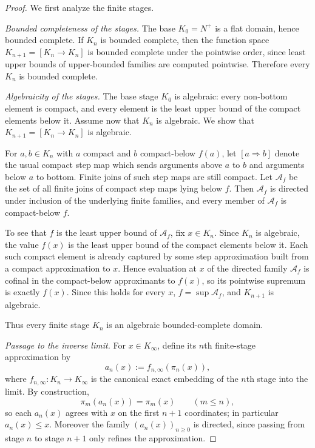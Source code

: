 \documentclass[webpdf,traditional,large,numbered]{oup-authoring-template}
\theoremstyle{thmstyleone}%
\theoremstyle{thmstyletwo}%
\theoremstyle{thmstylethree}%
\newcommand{\Kinf}{K_\infty}
\begin{document}
\begin{proof}
  We first analyze the finite stages.

  \smallskip
  \noindent\emph{Bounded completeness of the stages.}
  The base $K_0=N^+$ is a flat domain, hence bounded complete.
  If $K_n$ is bounded complete, then the function space
  $K_{n+1}=[K_n\to K_n]$ is bounded complete under the pointwise order, since
  least upper bounds of upper-bounded families are computed pointwise.
  Therefore every $K_n$ is bounded complete.

  \smallskip
  \noindent\emph{Algebraicity of the stages.}
  The base stage $K_0$ is algebraic: every non-bottom element is compact, and
  every element is the least upper bound of the compact elements below it.
  Assume now that $K_n$ is algebraic. We show that
  $K_{n+1}=[K_n\to K_n]$ is algebraic.

  For $a,b\in K_n$ with $a$ compact and $b$ compact-below $f(a)$, let
  $[a\Rightarrow b]$ denote the usual compact step map which sends arguments
  above $a$ to $b$ and arguments below $a$ to bottom. Finite joins of such step
  maps are still compact. Let $\mathcal{A}_f$ be the set of all finite joins of
  compact step maps lying below $f$. Then $\mathcal{A}_f$ is directed under
  inclusion of the underlying finite families, and every member of
  $\mathcal{A}_f$ is compact-below $f$.

  To see that $f$ is the least upper bound of $\mathcal{A}_f$, fix
  $x\in K_n$. Since $K_n$ is algebraic, the value $f(x)$ is the least upper
  bound of the compact elements below it. Each such compact element is already
  captured by some step approximation built from a compact approximation to $x$.
  Hence evaluation at $x$ of the directed family $\mathcal{A}_f$ is cofinal in
  the compact-below approximants to $f(x)$, so its pointwise supremum is exactly
  $f(x)$. Since this holds for every $x$, $f=\sup \mathcal{A}_f$, and $K_{n+1}$
  is algebraic.

  Thus every finite stage $K_n$ is an algebraic bounded-complete domain.

  \smallskip
  \noindent\emph{Passage to the inverse limit.}
  For $x\in\Kinf$, define its $n$th finite-stage approximation by
  \[
    a_n(x):=f_{n,\infty}(\pi_n(x)),
  \]
  where $f_{n,\infty}:K_n\to\Kinf$ is the canonical exact embedding of the $n$th
  stage into the limit. By construction,
  \[
    \pi_m(a_n(x))=\pi_m(x)\qquad (m\le n),
  \]
  so each $a_n(x)$ agrees with $x$ on the first $n+1$ coordinates; in
  particular $a_n(x)\le x$. Moreover the family $(a_n(x))_{n\ge 0}$ is directed,
  since passing from stage $n$ to stage $n+1$ only refines the approximation.


\end{proof}
\end{document}
